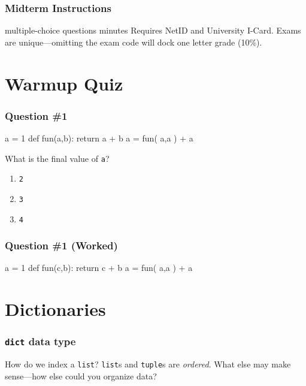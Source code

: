 \documentclass[11pt]{beamer}
\begin{document}
\begin{frame}
  \frametitle{Midterm Instructions}
  \Enlarge

  \begin{itemize}
   multiple-choice questions
   minutes
  \myitem  Requires NetID and University I-Card.
  \mysubitem  Exams are unique—omitting the exam code will dock one letter grade (10\%).
  \end{itemize}
\end{frame}

\section{Warmup Quiz}

\begin{frame}[fragile]
  \frametitle{Question \#1}
  \Enlarge

  \begin{semiverbatim}
a = 1
def fun(a,b):
    return a + b
a = fun( a,a ) + a
  \end{semiverbatim}
  What is the final value of \texttt{a}?
  \begin{enumerate}[label=\Alph*]
  \item  \texttt{2}
  \item  \texttt{3}
  \item  \texttt{4}
  \end{enumerate}
\end{frame}

\begin{frame}[fragile]
  \frametitle{Question \#1 (Worked)}
  \Enlarge

  \begin{semiverbatim}
a = 1
def fun(c,b):
    return c + b
a = fun( a,a ) + a
  \end{semiverbatim}
\end{frame}

\section{Dictionaries}

\begin{frame}[fragile]
  \frametitle{\texttt{dict} data type}
  \Enlarge

  \begin{itemize}
  \myitem  How do we index a \texttt{list}?
  \myitem  \texttt{list}s and \texttt{tuple}s are \emph{ordered}.
  \myitem  What else may make sense---how else could you organize data?
  \end{itemize}
\end{frame}
\end{document}
